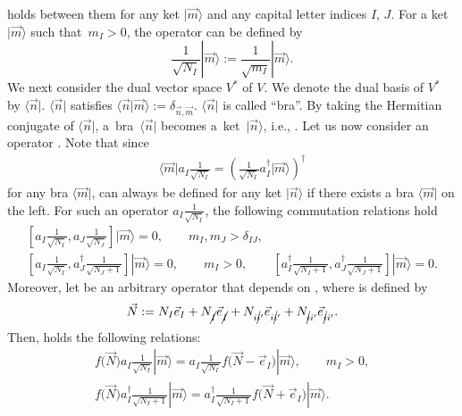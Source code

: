 \documentclass[pdftex]{sigma}
\numberwithin{equation}{section}
\begin{document}
holds between them for any ket
$
|
\vec{m}
\rangle
$
and any capital letter indices $I$, $J$. For a ket
$
|
\vec{m}
\rangle
$
such that~${m_{I}>0}$, the operator
can be defined by
\[
 \frac{1}{
 \sqrt{N_{I}}
 }
|
 \vec{m}
\rangle
 :=
 \frac{1}{
 \sqrt{m_{I}}
 }
|
 \vec{m}
\rangle
.
\]
We next consider the dual vector space $V^{\ast}$ of $V$. We denote the dual basis of $V^{\ast}$ by
$
\langle
\vec{n}
|
$.
$
\langle
\vec{n}
|
$
satisfies
$
\langle
\vec{n}
|
\vec{m}
\rangle
:=
\delta_{
\vec{n},
\vec{m}
}
$.
$
\langle
\vec{n}
|
$
is called ``bra''.
By taking the Hermitian conjugate of
$
\langle
\vec{n}
|
$,
a~bra~$
\langle
\vec{n}
|
$
becomes a~ket~$
|
\vec{n}
\rangle
$,
i.e.,
.
Let us now consider an operator
.
Note that since
\begin{align*}
\langle
\vec{m}
|
a_{I}
\frac{1}{
\sqrt{N_{I}}
}
=
 \left(
\frac{1}{
\sqrt{N_{I}}
}
a_{I}^{\dagger}
|
\vec{m}
\rangle
 \right)^{\dagger}
\end{align*}
for any bra
$
\langle
\vec{m}
|
$,
can always be defined for any ket
$
|
\vec{n}
\rangle
$
if there exists a bra
$
\langle
\vec{m}
|
$
on the left. For such an operator
$
a_{I}
\frac{1}{
\sqrt{N_{I}}
}
$,
the following commutation relations hold
\begin{gather*}
 \left[
 a_{I}
 \frac{1}{
 \sqrt{N_{I}}
 },
 a_{J}
 \frac{1}{
 \sqrt{N_{J}}
 }
 \right]
|
 \vec{m}
\rangle
 =
 0,
 \qquad
 m_{I},
 m_{J}
 >
 \delta_{IJ}
 ,\nonumber
 \\
 \left[
 a_{I}
 \frac{1}{
 \sqrt{N_{I}}
 },
 a_{J}^{\dagger}
 \frac{1}{
 \sqrt{N_{J}+1}
 }
 \right]
|
 \vec{m}
\rangle
 =
 0,
 \qquad
 m_{I}>0,
 \qquad
 \left[
 a_{I}^{\dagger}
 \frac{1}{
 \sqrt{N_{I}+1}
 },
 a_{J}^{\dagger}
 \frac{1}{
 \sqrt{N_{J}+1}
 }
 \right]
|
 \vec{m}
\rangle
 =
 0.
\end{gather*}
Moreover, let  be an arbitrary operator that depends on , where  is defined by
\begin{align*}
\vec{N}
:=
N_{I}%
\vec{e}_{I}
+
N_{\cancel{I}}%
\vec{e}_{\cancel{I}}
+
N_{i\cancel{i}'}%
\vec{e}_{i\cancel{i}'}
+
N_{\cancel{i}i'}
\vec{e}_{\cancel{i}i'}
.
\end{align*}
Then,  holds the following relations:
\begin{gather}
f\bigl(\vec{N}\bigr)
a_{I}
\frac{1}{
\sqrt{N_{I}}
}
|
\vec{m}
\rangle
=
a_{I}
\frac{1}{
\sqrt{N_{I}}
}
f\bigl(
\vec{N}
-
\vec{e}_{I}
\bigr)
|
\vec{m}
\rangle,
\qquad
m_{I}>0,
\label{relation_num_opr_fct1}
\\
f\bigl(\vec{N}\bigr)
a_{I}^{\dagger}
\frac{1}{
\sqrt{N_{I}+1}
}
|
\vec{m}
\rangle
=
a_{I}^{\dagger}
\frac{1}{
\sqrt{N_{I}+1}
}
f
\bigl(
\vec{N}
+
\vec{e}_{I}
\bigr)
|
\vec{m}
\rangle.\label{relation_num_opr_fct2}
\end{gather}
\end{document}
